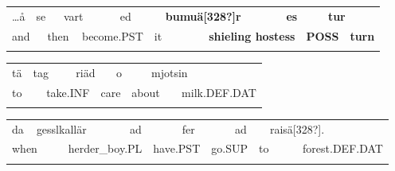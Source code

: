 \begin{tabular}{llllllllllllll}
\lsptoprule
…å & \multicolumn{2}{l}{se

} & \multicolumn{2}{l}{vart

} & \multicolumn{2}{l}{ed

} & \multicolumn{2}{l}{{\bfseries bumuä[328?]r}

} & \multicolumn{2}{l}{{\bfseries es}

} & \multicolumn{2}{l}{{\bfseries tur}

} & \\
\multicolumn{2}{l}{and

} & \multicolumn{2}{l}{then

} & \multicolumn{2}{l}{become.PST

} & \multicolumn{2}{l}{it

} & \multicolumn{2}{l}{{\bfseries shieling hostess}

} & \multicolumn{2}{l}{{\bfseries POSS}

} & \multicolumn{2}{l}{{\bfseries turn}

}\\
\lspbottomrule
\end{tabular}

\begin{tabular}{llllllllll}
\lsptoprule
tä & \multicolumn{2}{l}{tag

} & \multicolumn{2}{l}{riäd

} & \multicolumn{2}{l}{ o

} & \multicolumn{2}{l}{mjotsin

} & \\
\multicolumn{2}{l}{to

} & \multicolumn{2}{l}{take.INF

} & \multicolumn{2}{l}{care

} & \multicolumn{2}{l}{about

} & \multicolumn{2}{l}{milk.DEF.DAT

}\\
\lspbottomrule
\end{tabular}

\begin{tabular}{llllllllllll}
\lsptoprule
da & \multicolumn{2}{l}{gesslkallär

} & \multicolumn{2}{l}{ad

} & \multicolumn{2}{l}{fer

} & \multicolumn{2}{l}{ad

} & \multicolumn{2}{l}{raisä[328?].

} & \\
\multicolumn{2}{l}{when

} & \multicolumn{2}{l}{herder\_boy.PL

} & \multicolumn{2}{l}{have.PST

} & \multicolumn{2}{l}{go.SUP

} & \multicolumn{2}{l}{to

} & \multicolumn{2}{l}{forest.DEF.DAT

}\\
\lspbottomrule
\end{tabular}

